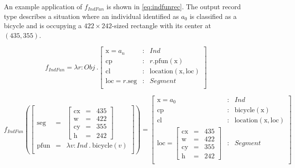 
An example application of $f_{IndFun}$ is shown in \autoref{eq:indfunrec}.
The output record type describes a situation where an individual identified as $a_0$ is classified as a bicycle and is occupying a $422 \times 242$-sized rectangle with its center at $(435, 355)$.

\begin{equation}\label{eq:indfundef}
f_{IndFun} = \lambda r : Obj\ . \left[\begin{array}{rcl}
    \text{x} = a_n &:& Ind \\
    \text{cp} &:& r.\text{pfun}(\text{x}) \\
    \text{cl} &:& \text{location}(\text{x}, \text{loc}) \\
    \text{loc} = r.\text{seg} &:& Segment\\
\end{array}\right]
\end{equation}

\begin{equation}\label{eq:indfunrec}
f_{IndFun}(
\left[\begin{array}{rcl}
\text{seg} &=& \left[\begin{array}{rcl}
\text{cx} &=& 435\\
\text{w} &=& 422\\
\text{cy} &=& 355\\
\text{h} &=& 242
\end{array}\right]\\
\text{pfun} &=& \lambda v:Ind\ .\ \text{bicycle}(v)\\
\end{array}\right]
) =
\left[\begin{array}{rcl}
    \text{x} = a_0 &:& Ind \\
    \text{cp} &:& \text{bicycle}(\text{x}) \\
    \text{cl} &:& \text{location}(\text{x}, \text{loc}) \\
    \text{loc} = \left[\begin{array}{rcl}
        \text{cx} &=& 435\\
        \text{w} &=& 422\\
        \text{cy} &=& 355\\
        \text{h} &=& 242
		\end{array}\right] &:& Segment\\
\end{array}\right]
\end{equation}



